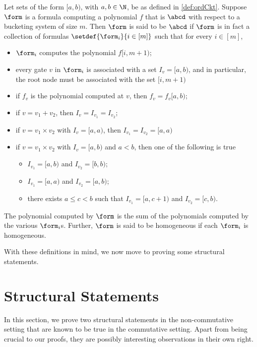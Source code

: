 \begin{definition}\label{def:ordForm}	
	Let sets of the form $[a,b)$, with $a,b \in \N$, be as defined in \autoref{def:ordCkt}.
	Suppose $\form$ is a formula computing a polynomial $f$ that is $\abcd$ with respect to a bucketing system of size $m$. Then $\form$ is said to be $\abcd$ if $\form$ is in fact a collection of formulas $\setdef{\form_i}{i \in [m]}$ such that for every $i \in [m]$,
	\begin{itemize}
		\item $\form_i$ computes the polynomial $f[i,m+1)$;
		\item every gate $v$ in $\form_i$ is associated with a set $I_v = [a,b)$, and in particular, the root node must be associated with the set $[i, m+1)$
		\item if $f_v$ is the polynomial computed at $v$, then $f_v = f_v[a, b)$;
		\item if $v = v_1 + v_2$, then $I_v = I_{v_1} = I_{v_2}$;
		\item if $v = v_1 \times v_2$ with $I_v = [a, a)$, then $I_{v_1} = I_{v_2} = [a,a)$
		\item  if $v = v_1 \times v_2$ with $I_v = [a, b)$ and $a < b$, then one of the following is true
		\begin{itemize}
			\item $I_{v_1} = [a,b)$ and $I_{v_2} = [b,b)$;
			\item $I_{v_1} = [a,a)$ and $I_{v_2} = [a,b)$;
			\item there exists $a \leq c < b$ such that $I_{v_1} = [a, c+1)$ and $I_{v_2} = [c, b)$.
		\end{itemize} 
	\end{itemize}
	The polynomial computed by $\form$ is the sum of the polynomials computed by the various $\form_i$s.
	Further, $\form$ is said to be homogeneous if each $\form_i$ is homogeneous.
\end{definition}

\hspace{.5em}

\noindent With these definitions in mind, we now move to proving some structural statements. 

\section{Structural Statements}\label{sec:structural-statements}

In this section, we prove two structural statements in the non-commutative setting that are known to be true in the commutative setting. 
Apart from being crucial to our proofs, they are possibly interesting observations in their own right.

